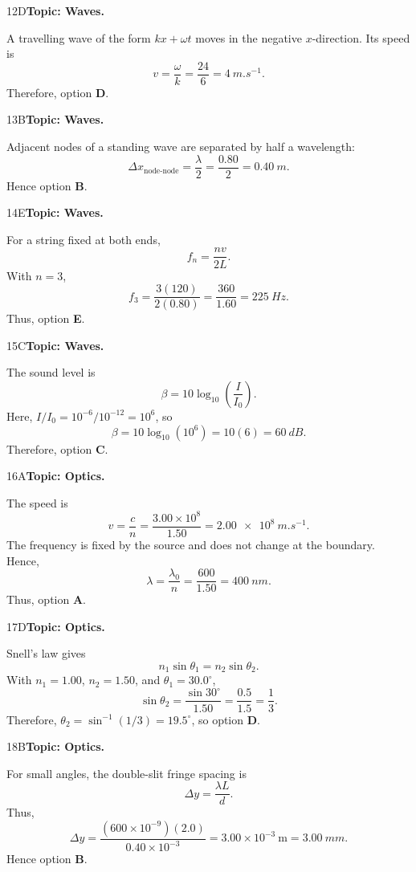 \documentclass[10pt,a4paper]{physicsquiz}
\begin{document}
\begin{workedsolution}{12}{D}\textbf{Topic: Waves.}\par A travelling wave of the form \(kx+\omega t\) moves in the negative \(x\)-direction. Its speed is
  \[
    v=\frac{\omega}{k}=\frac{24}{6}=\SI{4}{m.s^{-1}}.
  \]
  Therefore, option \textbf{D}.\end{workedsolution}
\begin{workedsolution}{13}{B}\textbf{Topic: Waves.}\par Adjacent nodes of a standing wave are separated by half a wavelength:
  \[
    \Delta x_{\text{node-node}}=\frac{\lambda}{2}
    =\frac{0.80}{2}=\SI{0.40}{m}.
  \]
  Hence option \textbf{B}.\end{workedsolution}
\begin{workedsolution}{14}{E}\textbf{Topic: Waves.}\par For a string fixed at both ends,
  \[
    f_n=\frac{nv}{2L}.
  \]
  With \(n=3\),
  \[
    f_3=\frac{3(120)}{2(0.80)}=\frac{360}{1.60}=\SI{225}{Hz}.
  \]
  Thus, option \textbf{E}.\end{workedsolution}
\begin{workedsolution}{15}{C}\textbf{Topic: Waves.}\par The sound level is
  \[
    \beta=10\log_{10}\left(\frac{I}{I_0}\right).
  \]
  Here, \(I/I_0=10^{-6}/10^{-12}=10^6\), so
  \[
    \beta=10\log_{10}(10^6)=10(6)=\SI{60}{dB}.
  \]
  Therefore, option \textbf{C}.\end{workedsolution}
\begin{workedsolution}{16}{A}\textbf{Topic: Optics.}\par The speed is
  \[
    v=\frac{c}{n}=\frac{3.00\times10^8}{1.50}=\SI{2.00e8}{m.s^{-1}}.
  \]
  The frequency is fixed by the source and does not change at the boundary. Hence,
  \[
    \lambda=\frac{\lambda_0}{n}=\frac{600}{1.50}=\SI{400}{nm}.
  \]
  Thus, option \textbf{A}.\end{workedsolution}
\begin{workedsolution}{17}{D}\textbf{Topic: Optics.}\par Snell's law gives
  \[
    n_1\sin\theta_1=n_2\sin\theta_2.
  \]
  With \(n_1=1.00\), \(n_2=1.50\), and \(\theta_1=30.0^\circ\),
  \[
    \sin\theta_2=\frac{\sin30^\circ}{1.50}=\frac{0.5}{1.5}=\frac13.
  \]
  Therefore, \(\theta_2=\sin^{-1}(1/3)=19.5^\circ\), so option \textbf{D}.\end{workedsolution}
\begin{workedsolution}{18}{B}\textbf{Topic: Optics.}\par For small angles, the double-slit fringe spacing is
  \[
    \Delta y=\frac{\lambda L}{d}.
  \]
  Thus,
  \[
    \Delta y=\frac{(600\times10^{-9})(2.0)}{0.40\times10^{-3}}
    =3.00\times10^{-3}\ \mathrm{m}
    =\SI{3.00}{mm}.
  \]
  Hence option \textbf{B}.\end{workedsolution}
\end{document}
